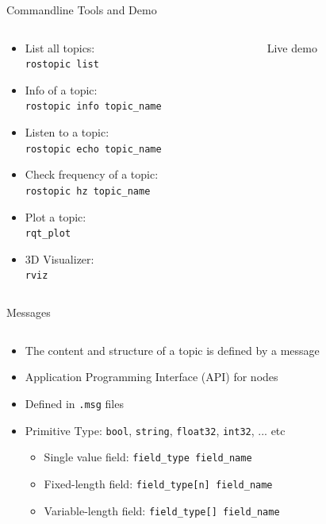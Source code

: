 \documentclass[aspectratio=43]{beamer}
\newcommand{\inline}[1]{\texttt{#1}}
\begin{document}
\begin{frame}{Commandline Tools and Demo}
	\begin{columns}
		\begin{column}{0.5\textwidth}
			\begin{itemize}
				\item List all topics:\\\inline{rostopic list}
				\item Info of a topic:\\\inline{rostopic info topic_name}
				\item Listen to a topic:\\\inline{rostopic echo topic_name}
				\item Check frequency of a topic:\\\inline{rostopic hz topic_name}
				\item Plot a topic:\\\inline{rqt_plot}
				\item 3D Visualizer:\\\inline{rviz}
			\end{itemize}
		\end{column}
		\begin{column}{0.5\textwidth}
			\centering
			Live demo
		\end{column}
	\end{columns}
\end{frame}


\begin{frame}{Messages}
	\begin{columns}
		\begin{column}{1.0\textwidth}
			\begin{itemize}[<+->]
				\item The content and structure of a topic is defined by a message
				\item Application Programming Interface (API) for nodes
				\item Defined in \inline{.msg} files
				\item Primitive Type: \inline{bool}, \inline{string}, \inline{float32}, \inline{int32}, ... etc
				\begin{itemize}
					\item Single value field: \inline{field_type field_name}\\%
					\item Fixed-length field: \inline{field_type[n] field_name}\\%
					\item Variable-length field: \inline{field_type[] field_name}
				\end{itemize}
			\end{itemize}
		\end{column}
	\end{columns}
\end{frame}
\end{document}
